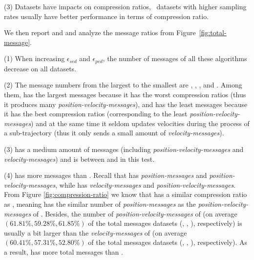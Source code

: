 {\ni (3) Datasets have impacts on compression ratios, \ie~datasets with higher sampling rates usually have better performance in terms of compression ratio.
	


 We then report and and analyze the message ratios from Figure~\ref{fig:total-message}.


\ni (1) When increasing $\epsilon_{sed}$ and $\epsilon_{ped}$, the number of messages of all these algorithms decrease on all datasets.

\ni (2) The message numbers from the largest to the smallest are \ldrh, \grts, \citt, \bitt and \sitt. Among them, \ldrh has the largest messages because it has the worst compression ratios (thus it produces many \emph{position-velocity-messages}), and \sitt has the least messages because it has the best compression ratios (corresponding to the least \emph{position-velocity-messages}) and at the same time it seldom updates velocities during the process of a sub-trajectory (thus it only sends a small amount of \emph{velocity-messages}).


\ni (3) \citt has a medium amount of messages (including \emph{position-velocity-messages} and \emph{velocity-messages}) and \bitt is between \citt and \sitt in this test.


\ni (4) \grts has more messages than \citt. Recall that \grts has \emph{position-messages} and \emph{position-velocity-messages}, while \citt has \emph{velocity-messages} and \emph{position-velocity-messages}. From Figure \ref{fig:compression-ratio} we know that \grts has a similar compression ratio as \citt, meaning \grts has the similar number of \emph{position-messages} as the \emph{position-velocity-messages} of \citt. Besides, the  number of \emph{position-velocity-messages} of \grts ({on average $(61.81\%, 59.28\%, 61.85\%)$} of the total messages \wrt datasets (\mopsi, \sercar, \geolife), respectively) is usually a bit larger than the \emph{velocity-messages} of \citt (on average $(60.41\%, 57.31\%, 52.80\%)$ of the total messages \wrt datasets (\mopsi, \sercar, \geolife), respectively). As a result, \grts has more total messages than \citt.

}
